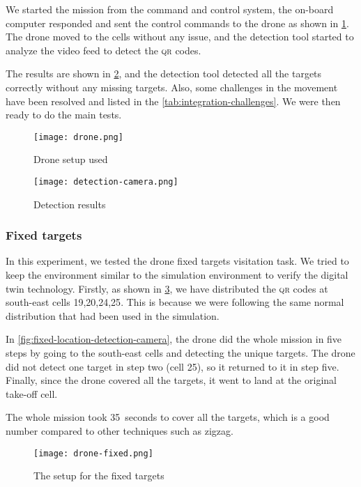 \documentclass[../main.tex]{subfiles}
\begin{document}
We started the mission from the command and control system, 
the on-board computer responded and sent the control commands 
to the drone as shown in \cref{fig:experiment-drone}.
The drone moved to the cells without any issue,
and the detection tool started to analyze 
the video feed to detect the \textsc{qr} codes.

The results are shown in \cref{fig:detection-camera}, 
and the detection tool detected all the targets correctly 
without any missing targets. Also, some challenges 
in the movement have been resolved and listed in 
the \cref{tab:integration-challenges}. 
We were then ready to do the main tests.

\begin{figure}[H]
	\centering
	\texttt{[image: drone.png]}
	\caption{Drone setup used}
	\label{fig:experiment-drone}
\end{figure} 

\begin{figure}[H]
	\centering
	\texttt{[image: detection-camera.png]}
	\caption{Detection results}
	\label{fig:detection-camera}
\end{figure}

\subsubsection{Fixed targets}

In this experiment, we tested the drone fixed targets
visitation task. We tried to keep the environment similar
to the simulation environment to verify the digital twin technology.
Firstly, as shown in \cref{fig:targets-location},
we have distributed the \textsc{qr} codes at south-east cells 
{19,20,24,25}. This is because we were following 
the same normal distribution that had been used in the simulation.

In \cref{fig:fixed-location-detection-camera},
the drone did the whole mission in five steps by going
to the south-east cells and detecting the unique targets. 
The drone did not detect one target in 
step two (cell 25), so it returned to it in step five. Finally,
since the drone covered all the targets, it 
went to land at the original take-off cell.

The whole mission took \SI{35}{seconds} to cover all the targets,
which is a good number compared to other techniques such as zigzag.

\begin{figure}[H]
	\centering
	\texttt{[image: drone-fixed.png]}
	\caption{The setup for the fixed targets}
	\label{fig:targets-location}
\end{figure}
\end{document}
